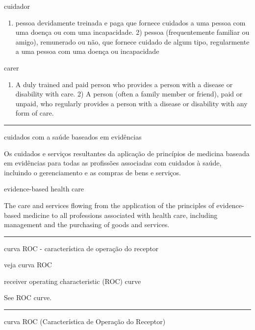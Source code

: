 \documentclass[
]{book}
\providecommand{\tightlist}{%
  \setlength{\itemsep}{0pt}\setlength{\parskip}{0pt}}
\begin{document}
cuidador

\begin{enumerate}
\def\labelenumi{\arabic{enumi})}
\tightlist
\item
  pessoa devidamente treinada e paga que fornece cuidados a uma pessoa com uma doença ou com uma incapacidade. 2) pessoa (frequentemente familiar ou amigo), remunerado ou não, que fornece cuidado de algum tipo, regularmente a uma pessoa com uma doença ou incapacidade
\end{enumerate}

carer

\begin{enumerate}
\def\labelenumi{\arabic{enumi})}
\tightlist
\item
  A duly trained and paid person who provides a person with a disease or disability with care. 2) A person (often a family member or friend), paid or unpaid, who regularly provides a person with a disease or disability with any form of care.
\end{enumerate}

\begin{center}\rule{0.5\linewidth}{0.5pt}\end{center}

cuidados com a saúde baseados em evidências

Os cuidados e serviços resultantes da aplicação de princípios de medicina baseada em evidências para todas as profissões associadas com cuidados à saúde, incluindo o gerenciamento e as compras de bens e serviços.

evidence-based health care

The care and services flowing from the application of the principles of evidence-based medicine to all professions associated with health care, including management and the purchasing of goods and services.

\begin{center}\rule{0.5\linewidth}{0.5pt}\end{center}

curva ROC - característica de operação do receptor

veja curva ROC

receiver operating characteristic (ROC) curve

See ROC curve.

\begin{center}\rule{0.5\linewidth}{0.5pt}\end{center}

curva ROC (Característica de Operação do Receptor)
\end{document}
